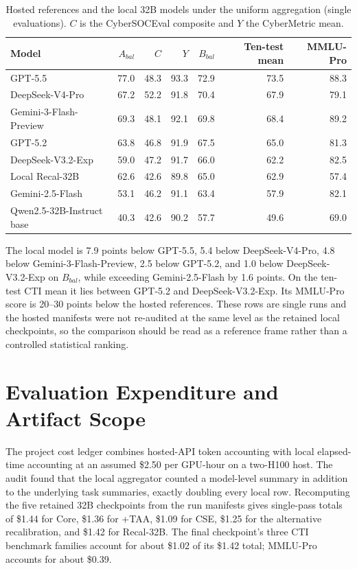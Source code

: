 \documentclass[conference]{IEEEtran}
\begin{document}
\begin{table}[t]
\caption{Hosted references and the local 32B models under the uniform aggregation (single evaluations). $C$ is the CyberSOCEval composite and $Y$ the CyberMetric mean.}
\label{tab:hosted}
\centering
\scriptsize
\setlength{\tabcolsep}{4.0pt}
\begin{tabular}{@{}lrrrrrr@{}}
\toprule
Model & $A_{bal}$ & $C$ & $Y$ & $B_{bal}$ & Ten-test mean & MMLU-Pro \\
\midrule
GPT-5.5 & 77.0 & 48.3 & 93.3 & 72.9 & 73.5 & 88.3 \\
DeepSeek-V4-Pro & 67.2 & 52.2 & 91.8 & 70.4 & 67.9 & 79.1 \\
Gemini-3-Flash-Preview & 69.3 & 48.1 & 92.1 & 69.8 & 68.4 & 89.2 \\
GPT-5.2 & 63.8 & 46.8 & 91.9 & 67.5 & 65.0 & 81.3 \\
DeepSeek-V3.2-Exp & 59.0 & 47.2 & 91.7 & 66.0 & 62.2 & 82.5 \\
Local Recal-32B & 62.6 & 42.6 & 89.8 & 65.0 & 62.9 & 57.4 \\
Gemini-2.5-Flash & 53.1 & 46.2 & 91.1 & 63.4 & 57.9 & 82.1 \\
Qwen2.5-32B-Instruct base & 40.3 & 42.6 & 90.2 & 57.7 & 49.6 & 69.0 \\
\bottomrule
\end{tabular}
\end{table}

The local model is 7.9 points below GPT-5.5, 5.4 below DeepSeek-V4-Pro, 4.8 below Gemini-3-Flash-Preview, 2.5 below GPT-5.2, and 1.0 below DeepSeek-V3.2-Exp on $B_{bal}$, while exceeding Gemini-2.5-Flash by 1.6 points. On the ten-test CTI mean it lies between GPT-5.2 and DeepSeek-V3.2-Exp. Its MMLU-Pro score is 20--30 points below the hosted references. These rows are single runs and the hosted manifests were not re-audited at the same level as the retained local checkpoints, so the comparison should be read as a reference frame rather than a controlled statistical ranking.

\section{Evaluation Expenditure and Artifact Scope}
The project cost ledger combines hosted-API token accounting with local elapsed-time accounting at an assumed \$2.50 per GPU-hour on a two-H100 host. The audit found that the local aggregator counted a model-level summary in addition to the underlying task summaries, exactly doubling every local row. Recomputing the five retained 32B checkpoints from the run manifests gives single-pass totals of \$1.44 for Core, \$1.36 for +TAA, \$1.09 for CSE, \$1.25 for the alternative recalibration, and \$1.42 for Recal-32B. The final checkpoint's three CTI benchmark families account for about \$1.02 of its \$1.42 total; MMLU-Pro accounts for about \$0.39.
\end{document}
